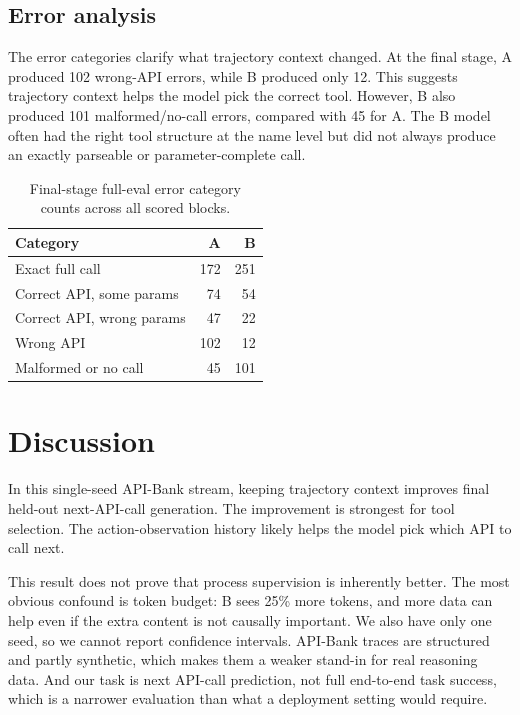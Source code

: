 \documentclass{article}
\begin{document}
\subsection{Error analysis}

The error categories clarify what trajectory context changed. At the final stage, A produced 102 wrong-API errors, while B produced only 12. This suggests trajectory context helps the model pick the correct tool. However, B also produced 101 malformed/no-call errors, compared with 45 for A. The B model often had the right tool structure at the name level but did not always produce an exactly parseable or parameter-complete call.

\begin{table}[t]
\centering
\caption{Final-stage full-eval error category counts across all scored blocks.}
\label{tab:errors}
\begin{tabular}{lrr}
\toprule
Category & A & B \\
\midrule
Exact full call & 172 & 251 \\
Correct API, some params & 74 & 54 \\
Correct API, wrong params & 47 & 22 \\
Wrong API & 102 & 12 \\
Malformed or no call & 45 & 101 \\
\bottomrule
\end{tabular}
\end{table}

\section{Discussion}

In this single-seed API-Bank stream, keeping trajectory context improves final held-out next-API-call generation. The improvement is strongest for tool selection. The action-observation history likely helps the model pick which API to call next.

This result does not prove that process supervision is inherently better. The most obvious confound is token budget: B sees 25\% more tokens, and more data can help even if the extra content is not causally important. We also have only one seed, so we cannot report confidence intervals. API-Bank traces are structured and partly synthetic, which makes them a weaker stand-in for real reasoning data. And our task is next API-call prediction, not full end-to-end task success, which is a narrower evaluation than what a deployment setting would require.
\end{document}
